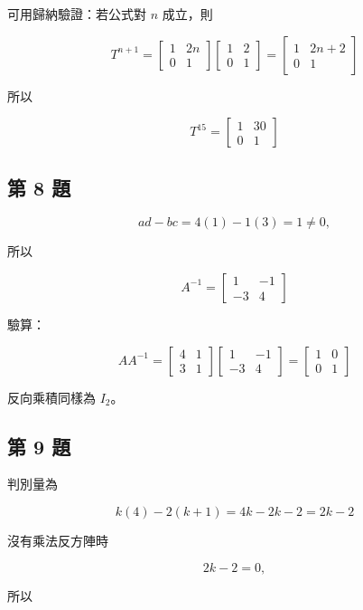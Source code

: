 \documentclass[11pt,a4paper]{article}
\begin{document}
可用歸納驗證：若公式對 \(n\) 成立，則

\[
T^{n+1}
=\begin{bmatrix}1&2n\\0&1\end{bmatrix}
\begin{bmatrix}1&2\\0&1\end{bmatrix}
=\begin{bmatrix}1&2n+2\\0&1\end{bmatrix}
\]

所以

\[
T^{15}=\begin{bmatrix}1&30\\0&1\end{bmatrix}
\]

\subsection{第 8 題}\label{ux7b2c-8-ux984c}

\[
ad-bc=4(1)-1(3)=1\ne0,
\]

所以

\[
A^{-1}=\begin{bmatrix}1&-1\\-3&4\end{bmatrix}
\]

驗算：

\[
AA^{-1}
=\begin{bmatrix}4&1\\3&1\end{bmatrix}
\begin{bmatrix}1&-1\\-3&4\end{bmatrix}
=\begin{bmatrix}1&0\\0&1\end{bmatrix}
\]

反向乘積同樣為 \(I_2\)。

\subsection{第 9 題}\label{ux7b2c-9-ux984c}

判別量為

\[
k(4)-2(k+1)=4k-2k-2=2k-2
\]

沒有乘法反方陣時

\[
2k-2=0,
\]

所以
\end{document}
